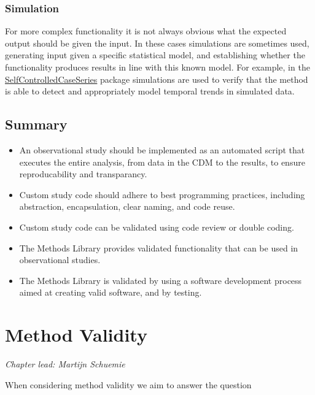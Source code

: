 \documentclass[11pt]{book}
\theoremstyle{definition}
\theoremstyle{definition}
\theoremstyle{definition}
\theoremstyle{remark}
\let\BeginKnitrBlock\begin \let\EndKnitrBlock\end
\begin{document}
\hypertarget{simulation}{%
\subsection{Simulation}\label{simulation}}

For more complex functionality it is not always obvious what the expected output should be given the input. In these cases simulations are sometimes used, generating input given a specific statistical model, and establishing whether the functionality produces results in line with this known model. For example, in the \href{https://ohdsi.github.io/SelfControlledCaseSeries/}{SelfControlledCaseSeries} package simulations are used to verify that the method is able to detect and appropriately model temporal trends in simulated data.

\hypertarget{summary-11}{%
\section{Summary}\label{summary-11}}

\BeginKnitrBlock{rmdsummary}
\begin{itemize}
\item
  An observational study should be implemented as an automated script that executes the entire analysis, from data in the CDM to the results, to ensure reproducability and transparancy.
\item
  Custom study code should adhere to best programming practices, including abstraction, encapsulation, clear naming, and code reuse.
\item
  Custom study code can be validated using code review or double coding.
\item
  The Methods Library provides validated functionality that can be used in observational studies.
\item
  The Methods Library is validated by using a software development process aimed at creating valid software, and by testing.
\end{itemize}
\EndKnitrBlock{rmdsummary}

\hypertarget{MethodValidity}{%
\chapter{Method Validity}\label{MethodValidity}}

\emph{Chapter lead: Martijn Schuemie}

When considering method validity we aim to answer the question
\end{document}
